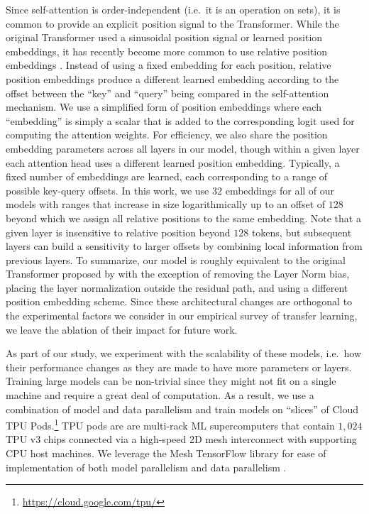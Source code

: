 \documentclass[twoside,11pt]{article}
\begin{document}
Since self-attention is order-independent (i.e.\ it is an operation on sets), it is common to provide an explicit position signal to the Transformer.
While the original Transformer used a sinusoidal position signal or learned position embeddings, it has recently become more common to use relative position embeddings \citep{shaw2018self,huang2018music}.
Instead of using a fixed embedding for each position, relative position embeddings produce a different learned embedding according to the offset between the ``key'' and ``query'' being compared in the self-attention mechanism.
We use a simplified form of position embeddings where each ``embedding'' is simply a scalar that is added to the corresponding logit used for computing the attention weights.
For efficiency, we also share the position embedding parameters across all layers in our model, though within a given layer each attention head uses a different learned position embedding.
Typically, a fixed number of embeddings are learned, each corresponding to a range of possible key-query offsets.
In this work, we use $32$ embeddings for all of our models with ranges that increase in size logarithmically up to an offset of $128$ beyond which we assign all relative positions to the same embedding.
Note that a given layer is insensitive to relative position beyond $128$ tokens, but subsequent layers can build a sensitivity to larger offsets by combining local information from previous layers.
To summarize, our model is roughly equivalent to the original Transformer proposed by \citet{vaswani2017attention} with the exception of removing the Layer Norm bias, placing the layer normalization outside the residual path, and using a different position embedding scheme.
Since these architectural changes are orthogonal to the experimental factors we consider in our empirical survey of transfer learning, we leave the ablation of their impact for future work.

As part of our study, we experiment with the scalability of these models, i.e.\ how their performance changes as they are made to have more parameters or layers.
Training large models can be non-trivial since they might not fit on a single machine and require a great deal of computation.
As a result, we use a combination of model and data parallelism and train models on ``slices'' of Cloud TPU Pods.\footnote{\url{https://cloud.google.com/tpu/}}
TPU pods are are multi-rack ML supercomputers that contain $1{,}024$ TPU v3 chips connected via a high-speed 2D mesh interconnect with supporting CPU host machines.
We leverage the Mesh TensorFlow library \citep{shazeer2018mesh} for ease of implementation of both model parallelism and data parallelism \citep{krizhevsky2014one}.
\end{document}
